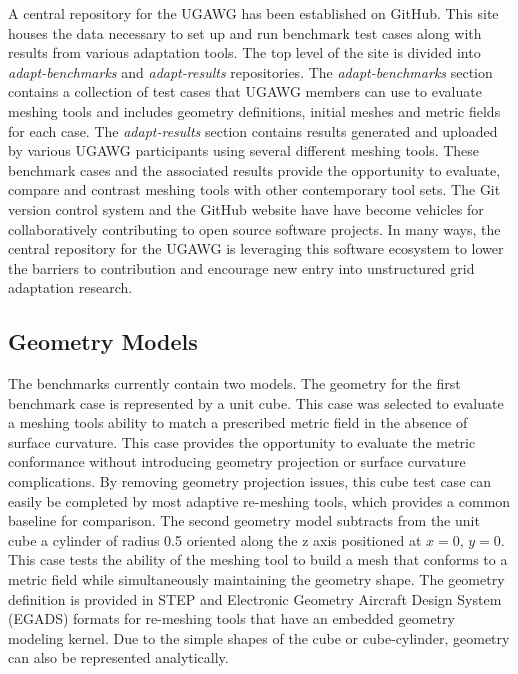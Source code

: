 \documentclass[3p,times,procedia,number]{elsarticle}
\begin{document}
A central repository for the UGAWG has been established on GitHub.\cite{ugawg-website}
This site houses the data necessary to set up and run benchmark test cases along with results from various adaptation tools.
The top level of the site is divided into \emph{adapt-benchmarks} and \emph{adapt-results} repositories.
The \emph{adapt-benchmarks} section contains a collection of test cases that UGAWG members can use to evaluate meshing
tools and includes geometry definitions, initial meshes and metric fields for each case.
The \emph{adapt-results} section contains results generated and uploaded by various UGAWG participants using several different meshing tools.
These benchmark cases and the associated results provide the opportunity to evaluate,
compare and contrast meshing tools with other contemporary tool sets.
The Git version control system and the GitHub website have have become
vehicles for collaboratively contributing to open source software
projects.
In many ways, the central repository for the UGAWG is leveraging
this software ecosystem to lower the barriers to contribution
and encourage new entry into unstructured grid adaptation research.

\subsection{Geometry Models}

The benchmarks currently contain two models.
The geometry for the first benchmark case is represented by a unit cube.
This case was selected to evaluate a meshing tools ability to match a prescribed metric field in the absence of surface curvature.
This case provides the opportunity to evaluate the metric conformance without introducing geometry projection or surface curvature complications.
By removing geometry projection issues, this cube test case can easily be completed by most adaptive re-meshing tools,
which provides a common baseline for comparison.
The second geometry model subtracts from the unit cube a cylinder of radius 0.5 oriented along the z axis positioned at $x=0$, $y=0$.
This case tests the ability of the meshing tool to build a mesh that conforms to a metric field while simultaneously maintaining the geometry shape.
The geometry definition is provided in STEP and 
Electronic Geometry Aircraft Design System
(EGADS\cite{haimes-drela-egads})
formats for re-meshing tools that have an embedded geometry modeling kernel.
Due to the simple shapes of the cube or cube-cylinder,
geometry can also be represented analytically.   
\end{document}
